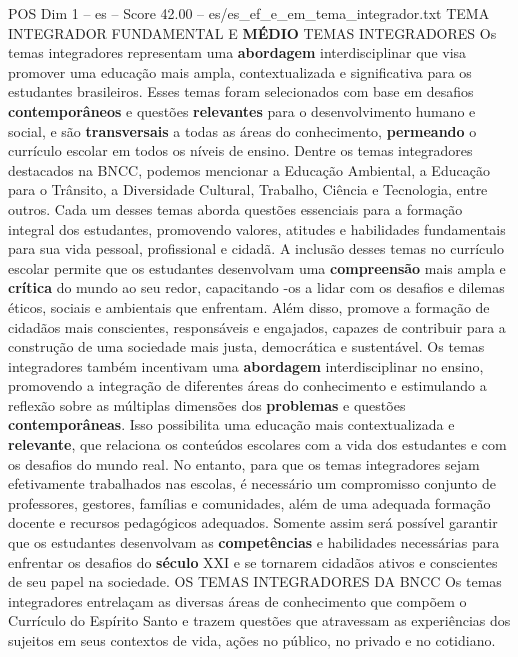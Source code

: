 \begin{textsample}{POS Dim 1 – es – Score 42.00 – es/es\_ef\_e\_em\_tema\_integrador.txt}  \label{ex:f1_pos_196}
TEMA INTEGRADOR FUNDAMENTAL E \textbf{MÉDIO} TEMAS INTEGRADORES Os temas integradores representam uma \textbf{abordagem} interdisciplinar que visa promover uma educação mais ampla, contextualizada e significativa para os estudantes brasileiros.
Esses temas foram selecionados com base em desafios \textbf{contemporâneos} e questões \textbf{relevantes} para o desenvolvimento humano e social, e são \textbf{transversais} a todas as áreas do conhecimento, \textbf{permeando} o currículo escolar em todos os níveis de ensino.
Dentre os temas integradores destacados na BNCC, podemos mencionar a Educação Ambiental, a Educação para o Trânsito, a Diversidade Cultural, Trabalho, Ciência e Tecnologia, entre outros.
Cada um desses temas aborda questões essenciais para a formação integral dos estudantes, promovendo valores, atitudes e habilidades fundamentais para sua vida pessoal, profissional e cidadã.
A inclusão desses temas no currículo escolar permite que os estudantes desenvolvam uma \textbf{compreensão} mais ampla e \textbf{crítica} do mundo ao seu redor, capacitando -os a lidar com os desafios e dilemas éticos, sociais e ambientais que enfrentam.
Além disso, promove a formação de cidadãos mais conscientes, responsáveis e engajados, capazes de contribuir para a construção de uma sociedade mais justa, democrática e sustentável.
Os temas integradores também incentivam uma \textbf{abordagem} interdisciplinar no ensino, promovendo a integração de diferentes áreas do conhecimento e estimulando a reflexão sobre as múltiplas dimensões dos \textbf{problemas} e questões \textbf{contemporâneas}.
Isso possibilita uma educação mais contextualizada e \textbf{relevante}, que relaciona os conteúdos escolares com a vida dos estudantes e com os desafios do mundo real.
No entanto, para que os temas integradores sejam efetivamente trabalhados nas escolas, é necessário um compromisso conjunto de professores, gestores, famílias e comunidades, além de uma adequada formação docente e recursos pedagógicos adequados.
Somente assim será possível garantir que os estudantes desenvolvam as \textbf{competências} e habilidades necessárias para enfrentar os desafios do \textbf{século} XXI e se tornarem cidadãos ativos e conscientes de seu papel na sociedade.
OS TEMAS INTEGRADORES DA BNCC Os temas integradores entrelaçam as diversas áreas de conhecimento que compõem o Currículo do Espírito Santo e trazem questões que atravessam as experiências dos sujeitos em seus contextos de vida, ações no público, no privado e no cotidiano.

\end{textsample}

